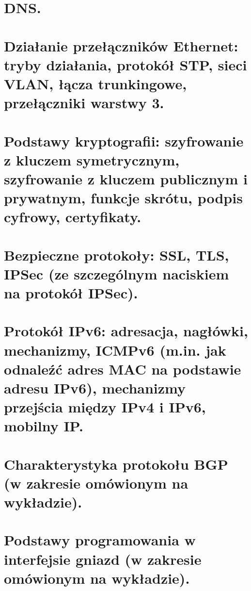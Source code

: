 \documentclass{unibooklet}
\begin{document}
    \section{DNS.}
    

    \section{Działanie przełączników Ethernet: tryby działania, protokół STP, sieci VLAN, łącza
    trunkingowe, przełączniki warstwy 3.}
    

    \section{Podstawy kryptografii: szyfrowanie z kluczem symetrycznym, szyfrowanie z kluczem
    publicznym i prywatnym, funkcje skrótu, podpis cyfrowy, certyfikaty.}
    

    \section{Bezpieczne protokoły: SSL, TLS, IPSec (ze szczególnym naciskiem na protokół IPSec).}
    

    \section{Protokół IPv6: adresacja, nagłówki, mechanizmy, ICMPv6 (m.in. jak odnaleźć adres MAC
    na podstawie adresu IPv6), mechanizmy przejścia między IPv4 i IPv6, mobilny IP.}
    

    \section{Charakterystyka protokołu BGP (w zakresie omówionym na wykładzie).}
    

    \section{Podstawy programowania w interfejsie gniazd (w zakresie omówionym na wykładzie).}
    
\end{document}
